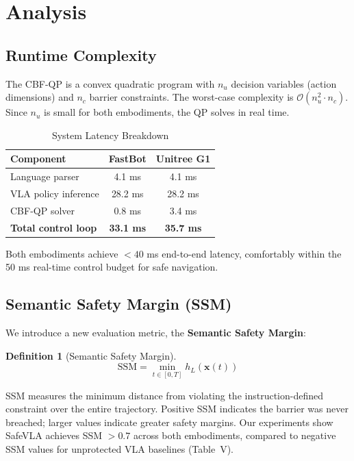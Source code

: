 \documentclass[conference]{IEEEtran}
\newtheorem{definition}{Definition}
\begin{document}
\section{Analysis}

\subsection{Runtime Complexity}
The CBF-QP is a convex quadratic program with $n_u$ decision variables (action dimensions) and $n_c$ barrier constraints. The worst-case complexity is $\mathcal{O}(n_u^2 \cdot n_c)$. Since $n_u$ is small for both embodiments, the QP solves in real time.

\begin{table}[h]
\centering
\caption{System Latency Breakdown}
\begin{tabular}{lcc}
\toprule
\textbf{Component} & \textbf{FastBot} & \textbf{Unitree G1} \\
\midrule
Language parser & 4.1 ms & 4.1 ms \\
VLA policy inference & 28.2 ms & 28.2 ms \\
CBF-QP solver & 0.8 ms & 3.4 ms \\
\midrule
\textbf{Total control loop} & \textbf{33.1 ms} & \textbf{35.7 ms} \\
\bottomrule
\end{tabular}
\end{table}

Both embodiments achieve $<40$ ms end-to-end latency, comfortably within the 50 ms real-time control budget for safe navigation.

\subsection{Semantic Safety Margin (SSM)}
We introduce a new evaluation metric, the \textbf{Semantic Safety Margin}:
\begin{definition}[Semantic Safety Margin]
\begin{equation}
\text{SSM} = \min_{t \in [0,T]} h_L(\mathbf{x}(t))
\end{equation}
\end{definition}
SSM measures the minimum distance from violating the instruction-defined constraint over the entire trajectory. Positive SSM indicates the barrier was never breached; larger values indicate greater safety margins. Our experiments show SafeVLA achieves SSM $> 0.7$ across both embodiments, compared to negative SSM values for unprotected VLA baselines (Table~V).
\end{document}
